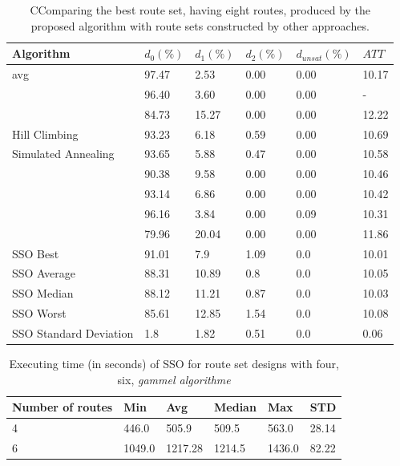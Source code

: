     \begin{table}[H]
    \centering
    \hspace*{-1.0cm}
    \begin{tabular}{|l||l|l|l|l|l|}
    \hline
    Algorithm & $d_0(\%)$ & $d_1(\%)$ & $d_2(\%)$ & $d_{unsat}(\%)$ & $ATT$ \\
    \hline
    \citet{kechagiopoulos14} avg & 97.47 & 2.53 & 0.00 & 0.00 & 10.17 \\
    \citet{nikolic14} & 96.40 & 3.60 & 0.00 & 0.00 & - \\
    \citet{kidwai98} & 84.73 & 15.27 & 0.00 & 0.00 & 12.22 \\
    \citet{fan09} Hill Climbing & 93.23 & 6.18 & 0.59 & 0.00 & 10.69 \\
    \citet{fan09} Simulated Annealing & 93.65 & 5.88 & 0.47 & 0.00 & 10.58 \\
    \citet{chakroborty02} & 90.38 & 9.58 & 0.00 & 0.00 & 10.46 \\
    \citet{zhang10} & 93.14 & 6.86 & 0.00 & 0.00 & 10.42 \\
    \citet{chew12} & 96.16 & 3.84 & 0.00 & 0.09 & 10.31 \\
    \citet{baaj91} & 79.96 & 20.04 & 0.00 & 0.00 & 11.86 \\
    \hline
    \hline
    SSO Best & 91.01 & 7.9 & 1.09 & 0.0 & 10.01\\
    SSO Average & 88.31 & 10.89 & 0.8 & 0.0 & 10.05\\
    SSO Median & 88.12 & 11.21 & 0.87 & 0.0 & 10.03\\
    SSO Worst & 85.61 & 12.85 & 1.54 & 0.0 & 10.08\\
    SSO Standard Deviation & 1.8 & 1.82 & 0.51 & 0.0 & 0.06\\
    \hline
    \end{tabular}
    \caption {CComparing the best route set, having eight routes, produced by the proposed algorithm with route sets constructed by other approaches.}
    \label{table:performanceComparison_8}
    \end{table}


\begin{table}[H]
    \centering
    \begin{tabular}{|l||l|l|l|l|l|}
    \hline
    Number of routes & Min & Avg & Median & Max & STD\\
    \hline
    4 & 446.0 & 505.9 & 509.5 & 563.0 & 28.14 \\
    6 & 1049.0 & 1217.28 & 1214.5 & 1436.0 & 82.22 \\
    \hline
    \end{tabular}
    \caption {Executing time (in seconds) of SSO for route set designs with four, six,  \emph{\color{blue} gammel algorithme}}
    \label{table:performanceComparison_runtimeOld}
\end{table}

